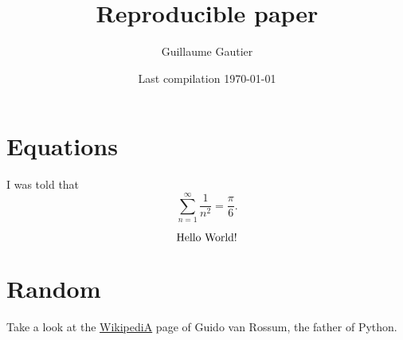 \documentclass{article}
\begin{document}

\title{Reproducible paper}

\author{Guillaume Gautier}

\date{ Last compilation \today }

\maketitle




\section{Equations} %
\label{sec:equations}

	I was told that
	\begin{equation}
		\sum_{n=1}^{\infty} \frac{1}{n^2} = \frac{\pi}{6}.
	\end{equation}

	\begin{equation}
		\text{Hello World!}
	\end{equation}


\section{Random} %
\label{sec:random}

	Take a look at the \href{https://en.wikipedia.org/wiki/Guido_van_Rossum}{WikipediA} page of Guido van Rossum, the father of Python.

\end{document}
